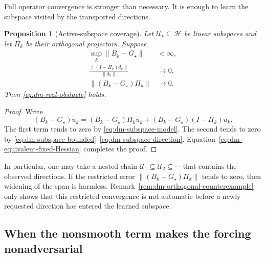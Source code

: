 \documentclass[10pt,leqno]{amsart}
\numberwithin{equation}{section}
\numberwithin{algorithm}{section}
\newtheorem{proposition}[theorem]{Proposition}
\theoremstyle{remark}
\newcommand{\Hcal}{\mathcal{H}}
\newcommand{\norm}[1]{\left\lVert #1 \right\rVert}
\begin{document}
Full operator convergence is stronger than necessary.  It is enough to learn the subspace visited by the transported directions.

\begin{proposition}[Active-subspace coverage]
\label{prop:dm-active-subspace}
Let $\mathcal U_k\subseteq\Hcal$ be linear subspaces and let $\Pi_k$ be their orthogonal projectors.  Suppose
\begin{align}
    \sup_k\norm{B_k-G_\star}&<\infty,
    \label{eq:dm-subspace-bounded}\\
    \frac{\norm{(I-\Pi_k)d_k}}{\norm{d_k}}&\to0,
    \label{eq:dm-subspace-direction}\\
    \norm{(B_k-G_\star)\Pi_k}&\to0.
    \label{eq:dm-subspace-model}
\end{align}
Then \eqref{eq:dm-real-obstacle} holds.
\end{proposition}

\begin{proof}
Write
\[
    (B_k-G_\star)u_k
    =(B_k-G_\star)\Pi_ku_k
      +(B_k-G_\star)(I-\Pi_k)u_k.
\]
The first term tends to zero by \eqref{eq:dm-subspace-model}.  The second tends to zero by \eqref{eq:dm-subspace-bounded}--\eqref{eq:dm-subspace-direction}.  Equation~\eqref{eq:dm-equivalent-fixed-Hessian} completes the proof.
\end{proof}

In particular, one may take a nested chain $\mathcal U_1\subseteq\mathcal U_2\subseteq\cdots$ that contains the observed directions.  If the restricted error $\norm{(B_k-G_\star)\Pi_k}$ tends to zero, then widening of the span is harmless.  Remark~\ref{rem:dm-orthogonal-counterexample} only shows that this restricted convergence is not automatic before a newly requested direction has entered the learned subspace.

\subsection{When the nonsmooth term makes the forcing nonadversarial}
\label{sec:dm-g-structure}
\end{document}
